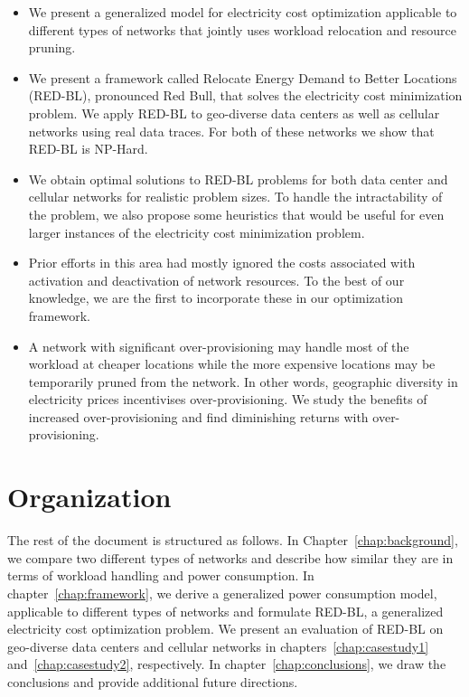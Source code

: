 \begin{itemize}
\item We present a generalized model for electricity cost optimization applicable to different types of networks that jointly uses workload relocation and resource pruning. 
\item We present a framework called Relocate Energy Demand to Better Locations (RED-BL), pronounced Red Bull, that solves the electricity cost minimization problem. We apply RED-BL to geo-diverse data centers as well as cellular networks using real data traces. For both of these networks we show that RED-BL is NP-Hard.
\item We obtain optimal solutions to RED-BL problems for both data center and cellular networks for realistic problem sizes. To handle the intractability of the problem, we also propose some heuristics that would be useful for even larger instances of the electricity cost minimization problem. 
\item Prior efforts in this area had mostly ignored the costs associated with activation and deactivation of network resources. To the best of our knowledge, we are the first to incorporate these in our optimization framework.
\item A network with significant over-provisioning may handle most of the workload at cheaper locations while the more expensive locations may be temporarily pruned from the network. In other words, geographic diversity in electricity prices incentivises over-provisioning. We study the benefits of increased over-provisioning and find diminishing returns with over-provisioning.
\end{itemize}

\section{Organization} The rest of the document is structured as follows. In Chapter~\ref{chap:background}, we compare two different types of networks and describe how similar they are in terms of workload handling and power consumption. In chapter~\ref{chap:framework}, we derive a generalized power consumption model, applicable to different types of networks and formulate RED-BL, a generalized electricity cost optimization problem. We present an evaluation of RED-BL on geo-diverse data centers and cellular networks in chapters~\ref{chap:casestudy1} and~\ref{chap:casestudy2}, respectively. In chapter~\ref{chap:conclusions}, we draw the conclusions and provide additional future directions.